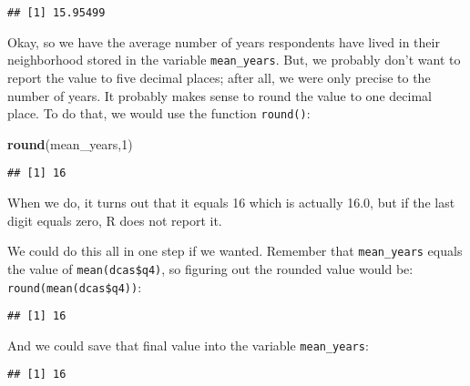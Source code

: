 \documentclass[]{article}
\newenvironment{Shaded}{\begin{snugshade}}{\end{snugshade}}
\newcommand{\KeywordTok}[1]{\textcolor[rgb]{0.13,0.29,0.53}{\textbf{{#1}}}}
\newcommand{\DecValTok}[1]{\textcolor[rgb]{0.00,0.00,0.81}{{#1}}}
\newcommand{\StringTok}[1]{\textcolor[rgb]{0.31,0.60,0.02}{{#1}}}
\newcommand{\NormalTok}[1]{{#1}}
\begin{document}
\begin{verbatim}
## [1] 15.95499
\end{verbatim}

Okay, so we have the average number of years respondents have lived in
their neighborhood stored in the variable \texttt{mean\_years}. But, we
probably don't want to report the value to five decimal places; after
all, we were only precise to the number of years. It probably makes
sense to round the value to one decimal place. To do that, we would use
the function \texttt{round()}:

\begin{Shaded}
\begin{Highlighting}[]
\KeywordTok{round}\NormalTok{(mean_years,}\DecValTok{1}\NormalTok{)}
\end{Highlighting}
\end{Shaded}

\begin{verbatim}
## [1] 16
\end{verbatim}

When we do, it turns out that it equals 16 which is actually 16.0, but
if the last digit equals zero, R does not report it.

We could do this all in one step if we wanted. Remember that
\texttt{mean\_years} equals the value of \texttt{mean(dcas\$q4)}, so
figuring out the rounded value would be: \texttt{round(mean(dcas\$q4))}:

\begin{Shaded}
\end{Shaded}

\begin{verbatim}
## [1] 16
\end{verbatim}

And we could save that final value into the variable
\texttt{mean\_years}:

\begin{Shaded}
\end{Shaded}

\begin{verbatim}
## [1] 16
\end{verbatim}
\end{document}
